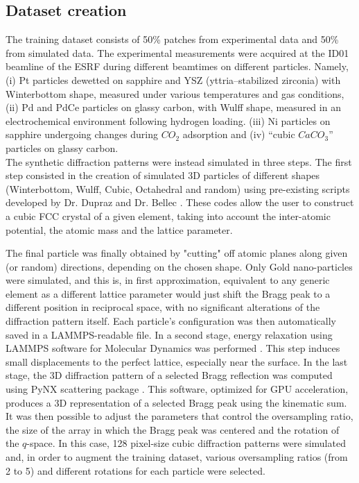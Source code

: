 \subsection{Dataset creation}\label{sec:dataset_creation3D}
The training dataset consists of 50\% patches from experimental data and 50\% from simulated data.
The experimental measurements were acquired at the ID01 beamline of the ESRF during different beamtimes on different particles.
Namely, (i) Pt particles dewetted on sapphire and YSZ (yttria–stabilized zirconia) with Winterbottom shape, 
measured under various temperatures and gas conditions, (ii) Pd and PdCe particles on glassy carbon, with
Wulff shape, measured in an electrochemical environment following hydrogen loading. (iii) Ni particles on sapphire undergoing
changes during $CO_2$ adsorption and (iv) ``cubic $CaCO_3$'' particles on glassy carbon.
\\
The synthetic diffraction patterns were instead simulated in three steps. The first step consisted in the creation of 
simulated 3D particles of different shapes (Winterbottom, Wulff, Cubic, Octahedral and random) using pre-existing scripts
developed by Dr. Dupraz and Dr. Bellec \cite{lim_convolutional_2021}. These codes allow the user to construct a cubic FCC
crystal of a given element, taking into account the inter-atomic potential, the atomic mass
and the lattice parameter. 

The final particle was finally obtained by "cutting" off atomic planes along given (or random)
directions, depending on the chosen shape. Only Gold nano-particles were simulated, and this is, in first approximation,
equivalent to any generic element as a different lattice parameter would just shift the Bragg peak to a different 
position in reciprocal space, with no significant alterations of the diffraction pattern itself.  
Each particle's configuration was then automatically saved in a LAMMPS-readable file. In a second stage,
energy relaxation using LAMMPS software for Molecular Dynamics was performed \cite{LAMMPS2022}. This step induces small displacements 
to the perfect lattice, especially near the surface. In the last stage, the 3D diffraction pattern of a selected Bragg 
reflection was computed using PyNX scattering package \cite{pynx_scattering}. This software, optimized for GPU 
acceleration, produces a 3D representation of a selected Bragg peak using the kinematic sum.
It was then possible to adjust the parameters that control the oversampling ratio, the size of the array in which the 
Bragg peak was centered and the rotation of the $q$-space. In this case, 128 pixel-size cubic diffraction 
patterns were simulated and, in order to augment the training dataset, various oversampling ratios (from 2 to 5) and 
different rotations for each particle were selected.

